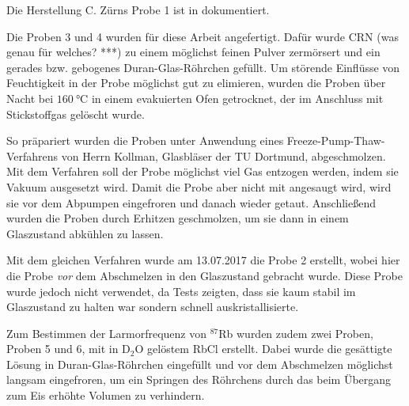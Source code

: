 Die Herstellung C. Zürns Probe 1 ist in \cite{zuern_arbeit} dokumentiert.

Die Proben 3 und 4 wurden für diese Arbeit angefertigt. Dafür wurde CRN (was genau für welches? ***) zu einem möglichst feinen Pulver zermörsert und ein gerades bzw. gebogenes Duran-Glas-Röhrchen gefüllt. Um störende Einflüsse von Feuchtigkeit in der Probe möglichst gut zu elimieren, wurden die Proben über Nacht bei $\SI{160}{\degreeCelsius}$ in einem evakuierten Ofen getrocknet, der im Anschluss mit Stickstoffgas gelöscht wurde.

So präpariert wurden die Proben unter Anwendung eines Freeze-Pump-Thaw-Ver\-fah\-rens von Herrn Kollman, Glasbläser der TU Dortmund, abgeschmolzen. Mit dem Verfahren soll der Probe möglichst viel Gas entzogen werden, indem sie Vakuum ausgesetzt wird. Damit die Probe aber nicht mit angesaugt wird, wird sie vor dem Abpumpen eingefroren und danach wieder getaut. Anschließend wurden die Proben durch Erhitzen geschmolzen, um sie dann in einem Glaszustand abkühlen zu lassen.

Mit dem gleichen Verfahren wurde am 13.07.2017 die Probe 2 erstellt, wobei hier die Probe \emph{vor} dem Abschmelzen in den Glaszustand gebracht wurde. Diese Probe wurde jedoch nicht verwendet, da Tests zeigten, dass sie kaum stabil im Glaszustand zu halten war sondern schnell auskristallisierte.

Zum Bestimmen der Larmorfrequenz von $^\text{87}$Rb wurden zudem zwei Proben, Proben 5 und 6, mit in D$_\text{2}$O gelöstem RbCl erstellt. Dabei wurde die gesättigte Lösung in Duran-Glas-Röhrchen eingefüllt und vor dem Abschmelzen möglichst langsam eingefroren, um ein Springen des Röhrchens durch das beim Übergang zum Eis erhöhte Volumen zu verhindern.
